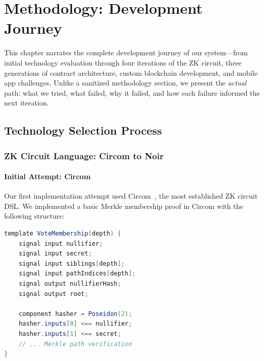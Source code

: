 \chapter{Methodology: Development Journey}\label{ch:methodology}

This chapter narrates the complete development journey of our system---from initial technology evaluation through four iterations of the ZK circuit, three generations of contract architecture, custom blockchain development, and mobile app challenges. Unlike a sanitized methodology section, we present the \textit{actual} path: what we tried, what failed, why it failed, and how each failure informed the next iteration.

\section{Technology Selection Process}

\subsection{ZK Circuit Language: Circom to Noir}

\subsubsection{Initial Attempt: Circom}

Our first implementation attempt used Circom~\cite{belles2022circom}, the most established ZK circuit DSL. We implemented a basic Merkle membership proof in Circom with the following structure:

\begin{lstlisting}[language=Java, caption={Initial Circom circuit attempt (abandoned).}]
template VoteMembership(depth) {
    signal input nullifier;
    signal input secret;
    signal input siblings[depth];
    signal input pathIndices[depth];
    signal output nullifierHash;
    signal output root;
    
    component hasher = Poseidon(2);
    hasher.inputs[0] <== nullifier;
    hasher.inputs[1] <== secret;
    // ... Merkle path verification
}
\end{lstlisting}

